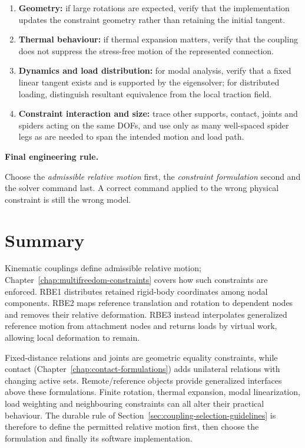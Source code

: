 \begin{enumerate}
    \item \textbf{Geometry:} if large rotations are expected, verify that the
          implementation updates the constraint geometry rather than retaining
          the initial tangent.
    \item \textbf{Thermal behaviour:} if thermal expansion matters, verify that
          the coupling does not suppress the stress-free motion of the represented
          connection.
    \item \textbf{Dynamics and load distribution:} for modal analysis, verify
          that a fixed linear tangent exists and is supported by the eigensolver;
          for distributed loading, distinguish resultant equivalence from the
          local traction field.
    \item \textbf{Constraint interaction and size:} trace other supports,
          contact, joints and spiders acting on the same DOFs, and use only as
          many well-spaced spider legs as are needed to span the intended motion
          and load path.
\end{enumerate}

\begin{bbox}
\textbf{Final engineering rule.}

Choose the \textit{admissible relative motion} first, the \textit{constraint
formulation} second and the solver command last. A correct command applied to the
wrong physical constraint is still the wrong model.
\end{bbox}


\section{Summary}

Kinematic couplings define admissible relative motion; Chapter~\ref{chap:multifreedom-constraints}
covers how such constraints are enforced. RBE1 distributes retained rigid-body
coordinates among nodal components. RBE2 maps reference translation and rotation
to dependent nodes and removes their relative deformation. RBE3 instead
interpolates generalized reference motion from attachment nodes and returns loads
by virtual work, allowing local deformation to remain.

Fixed-distance relations and joints are geometric equality constraints, while
contact (Chapter~\ref{chap:contact-formulations}) adds unilateral relations with
changing active sets. Remote/reference objects provide generalized interfaces
above these formulations. Finite rotation, thermal expansion, modal
linearization, load weighting and neighbouring constraints can all alter their
practical behaviour. The durable rule of Section~\ref{sec:coupling-selection-guidelines}
is therefore to define the permitted relative motion first, then choose the
formulation and finally its software implementation.
